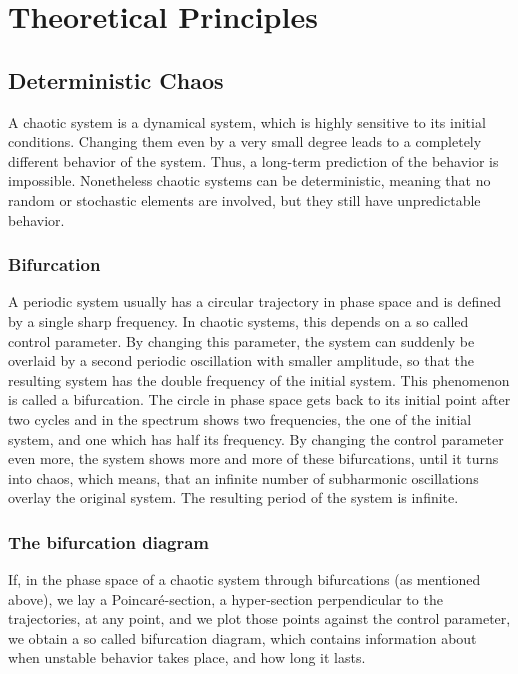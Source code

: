 \section{Theoretical Principles}

\subsection{Deterministic Chaos}

A chaotic system is a dynamical system, which is highly sensitive to its initial conditions. Changing them even by a very small degree leads to a completely different behavior of the system. Thus, a long-term prediction of the behavior is impossible. Nonetheless chaotic systems can be deterministic, meaning that no random or stochastic elements are involved, but they still have unpredictable behavior.

\subsubsection{Bifurcation}

A periodic system usually has a circular trajectory in phase space and is defined by a single sharp frequency. In chaotic systems, this depends on a so called control parameter. By changing this parameter, the system can suddenly be overlaid by a second periodic oscillation with smaller amplitude, so that the resulting system has the double frequency of the initial system. This phenomenon is called a bifurcation. The circle in phase space gets back to its initial point after two cycles and in the spectrum shows two frequencies, the one of the initial system, and one which has half its frequency. By changing the control parameter even more, the system shows more and more of these bifurcations, until it turns into chaos, which means, that an infinite number of subharmonic oscillations overlay the original system. The resulting period of the system is infinite.

\subsubsection{The bifurcation diagram}

If, in the phase space of a chaotic system through bifurcations (as mentioned above), we lay a Poincaré-section, a hyper-section perpendicular to the trajectories, at any point, and we plot those points against the control parameter, we obtain a so called bifurcation diagram, which contains information about when unstable behavior takes place, and how long it lasts.

